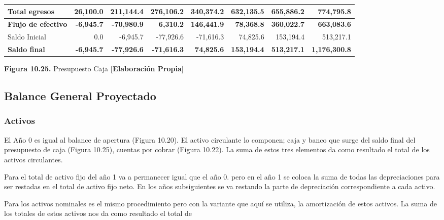 \begin{table}[H]
\begin{tabular}{|p{2.9cm}|r|r|r|r|r|r|r|}
\textbf{Total egresos} & \textbf{26,100.0} & \textbf{211,144.4} & \textbf{276,106.2} & \textbf{340,374.2} & \textbf{632,135.5} & \textbf{655,886.2} & \textbf{774,795.8} \\ \hline
\textbf{Flujo de efectivo} & \textbf{-6,945.7} & \textbf{-70,980.9} & \textbf{6,310.2} & \textbf{146,441.9} & \textbf{78,368.8} & \textbf{360,022.7} & \textbf{663,083.6} \\ \hline
Saldo Inicial & 0.0 & -6,945.7 & -77,926.6 & -71,616.3 & 74,825.6 & 153,194.4 & 513,217.1 \\ \hline
\textbf{Saldo final} & \textbf{-6,945.7} & \textbf{-77,926.6} & \textbf{-71,616.3} & \textbf{74,825.6} & \textbf{153,194.4} & \textbf{513,217.1} & \textbf{1,176,300.8} \\ \hline

\end{tabular}

\vspace{0.2cm}
\textbf{Figura 10.25.} Presupuesto Caja \textbf{[Elaboración Propia]}
\end{table}

\subsection{Balance General Proyectado}

\subsubsection{Activos}

El Año 0 es igual al balance de apertura (Figura 10.20). El activo circulante lo componen; caja y banco que surge del saldo final del presupuesto de caja (Figura 10.25), cuentas por cobrar (Figura 10.22). La suma de estos tres elementos da como resultado el total de los activos circulantes.

Para el total de activo fijo del año 1 va a permanecer igual que el año 0. pero en el año 1 se coloca la suma de todas las depreciaciones para ser restadas en el total de activo fijo neto. En los años subsiguientes se va restando la parte de depreciación correspondiente a cada activo.

Para los activos nominales es el mismo procedimiento pero con la variante que aquí se utiliza, la amortización de estos activos. La suma de los totales de estos activos nos da como resultado el total de
